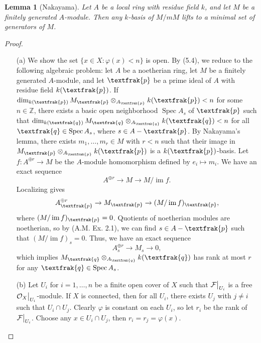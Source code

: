 \documentclass{article}
\newcommand{\goth}[1]{\textfrak{#1}}
\newcommand{\fF}{\mathcal{F}}
\newcommand{\fO}{\mathcal{O}}
\newcommand{\Z}{\mathbb{Z}}
\newtheorem{lemma}{Lemma}
\DeclareMathOperator{\im}{im}
\DeclareMathOperator{\spec}{Spec}
\newcommand\restr[2]{{%
  \left.\kern-\nulldelimiterspace %
  #1 %
  \vphantom{\big|} %
  \right|_{#2} %
}}
\begin{document}
\begin{enumerate} [label=\textbf{\arabic*.}, leftmargin=0em]
\begin{lemma} [Nakayama]
    Let $A$ be a local ring with residue field $k$, and let $M$ be a finitely generated $A$-module. Then any $k$-basis of $M / m M$ lifts to a minimal set of generators of $M$.
\end{lemma}

\begin{proof} $ $ \vspace{0pt}
    \begin{itemize} [leftmargin=0cm]
        \item[(a)] We show the set $\{ x \in X : \varphi(x) < n \}$ is open.  By (5.4), we reduce to the following algebraic problem: let $A$ be a noetherian ring, let $M$ be a finitely generated $A$-module, and let $\goth{p}$ be a prime ideal of $A$ with residue field $k(\goth{p})$. If $\dim_{k(\goth{p})} M_\goth{p} \otimes_{A_\goth{p}} k(\goth{p}) < n$ for some $n \in \Z$, there exists a basic open neighborhood $\spec{A_s}$ of $\goth{p}$ such that $\dim_{k(\goth{q})} M_\goth{q} \otimes_{A_\goth{q}} k(\goth{q}) < n$ for all $\goth{q} \in \spec{A_s}$, where $s \in A - \goth{p}$. By Nakayama's lemma, there exists $m_1, \dots, m_r \in M$ with $r < n$ such that their image in $M_\goth{p} \otimes_{A_\goth{p}} k(\goth{p})$ is a $k(\goth{p})$-basis. Let $f : A^{\oplus r} \to M$ be the $A$-module homomorphism defined by $e_i \mapsto m_i$. We have an exact sequence
        \begin{equation*}
            A^{\oplus r} \to M \to M / \im{f}.
        \end{equation*}
        Localizing gives
        \begin{equation*}
            A_\goth{p}^{\oplus r} \to M_\goth{p} \to (M / \im{f})_\goth{p},
        \end{equation*}
        where $(M / \im{f})_\goth{p} = 0$. Quotients of noetherian modules are noetherian, so by (A.M. Ex. 2.1), we can find $s \in A - \goth{p}$ such that $(M / \im{f})_s = 0$. Thus, we have an exact sequence
        \begin{equation*}
            A_s^{\oplus r} \to M_s \to 0,
        \end{equation*}
        which implies $M_\goth{q} \otimes_{A_\goth{q}} k(\goth{q})$ has rank at most $r$ for any $\goth{q} \in \spec{A_s}$.

        \item[(b)] Let $U_i$ for $i = 1, \dots, n$ be a finite open cover of $X$ such that $\restr{\fF}{U_i}$ is a free $\restr{\fO_X}{U_i}$-module. If $X$ is connected, then for all $U_i$, there exists $U_j$ with $j \neq i$ such that $U_i \cap U_j$. Clearly $\varphi$ is constant on each $U_i$, so let $r_i$ be the rank of $\restr{\fF}{U_i}$. Choose any $x \in U_i \cap U_j$, then $r_i = r_j = \varphi(x)$.


\end{itemize}
\end{proof}
\end{enumerate}
\end{document}
